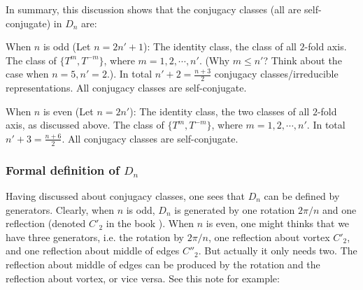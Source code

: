 In summary, this discussion shows that the conjugacy classes (all are
self-conjugate) in $D_n$
are:
\begin{fact}
    When $n$ is odd (Let $n=2n'+1$): The identity class, the class of
    all $2$-fold axis. The class of $\{ T^m, T^{-m}\}$, where
    $m=1,2,\cdots, n'$. (Why $m\leq n'$? Think about the case when
    $n=5,n'=2$.). In total $n'+2=\frac{n+3}{2}$ conjugacy
    classes/irreducible representations. All conjugacy classes are
    self-conjugate.
\end{fact}
\begin{fact}
    When $n$ is even (Let $n=2n'$): The identity class, the two
    classes of all $2$-fold axis, as discussed above. The class of
    $\{ T^m, T^{-m}\}$, where $m=1,2,\cdots, n'$. In total
    $n'+3=\frac{n+6}{2}$. All conjugacy classes are self-conjugate.
\end{fact}

\subsubsection{Formal definition of \texorpdfstring{$D_n$}{}}

Having discussed about conjugacy classes, one sees that $D_n$ can be
defined by generators.  Clearly, when $n$ is odd, $D_n$ is generated
by one rotation $2\pi/n$ and one reflection (denoted $C'_2$ in the
book \cite{book}). When $n$ is even, one might thinks that we have
three generators, i.e. the rotation by $2\pi/n$, one reflection about
vortex $C'_2$, and one reflection about middle of edges $C''_2$. But
actually it only needs two. The reflection about middle of edges can
be produced by the rotation and the reflection about vortex, or vice
versa. See this note for example:

